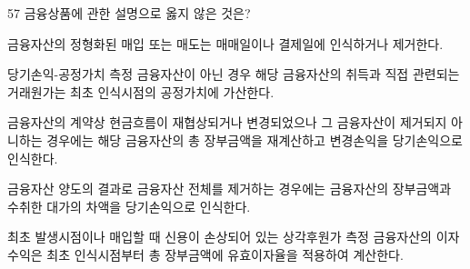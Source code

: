 \begin{question}{57}
금융상품에 관한 설명으로 옳지 않은 것은?
\begin{choices}
  \item 금융자산의 정형화된 매입 또는 매도는 매매일이나 결제일에 인식하거나 제거한다.
  \item 당기손익-공정가치 측정 금융자산이 아닌 경우 해당 금융자산의 취득과 직접 관련되는 거래원가는 최초 인식시점의 공정가치에 가산한다.
  \item 금융자산의 계약상 현금흐름이 재협상되거나 변경되었으나 그 금융자산이 제거되지 아니하는 경우에는 해당 금융자산의 총 장부금액을 재계산하고 변경손익을 당기손익으로 인식한다.
  \item 금융자산 양도의 결과로 금융자산 전체를 제거하는 경우에는 금융자산의 장부금액과 수취한 대가의 차액을 당기손익으로 인식한다.
  \item 최초 발생시점이나 매입할 때 신용이 손상되어 있는 상각후원가 측정 금융자산의 이자수익은 최초 인식시점부터 총 장부금액에 유효이자율을 적용하여 계산한다.
\end{choices}
\end{question}
